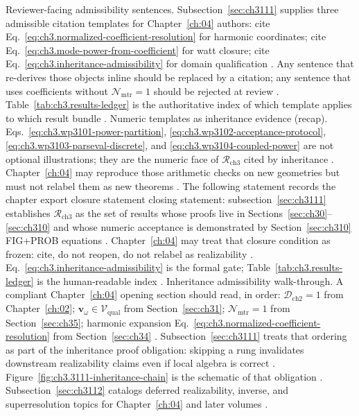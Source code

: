 Reviewer-facing admissibility sentences. Subsection~\ref{sec:ch3111} supplies three admissible citation templates for Chapter~\ref{ch:04} authors: cite Eq.~\eqref{eq:ch3.normalized-coefficient-resolution} for harmonic coordinates; cite Eq.~\eqref{eq:ch3.mode-power-from-coefficient} for watt closure; cite Eq.~\eqref{eq:ch3.inheritance-admissibility} for domain qualification
\cite{stratton1941}. Any sentence that re-derives those objects inline should be replaced by a citation; any sentence that uses coefficients without \(\mathcal{N}_{\mathrm{mtr}}=1\) should be rejected at review
\cite{devaney2004}. Table~\ref{tab:ch3.results-ledger} is the authoritative index of which template applies to which result bundle
\cite{hansen1988}.
Numeric templates as inheritance evidence (recap). Eqs.~\eqref{eq:ch3.wp3101-power-partition}, \eqref{eq:ch3.wp3102-acceptance-protocol}, \eqref{eq:ch3.wp3103-parseval-discrete}, and \eqref{eq:ch3.wp3104-coupled-power} are not optional illustrations; they are the numeric face of \(\mathcal{R}_{\mathrm{ch3}}\) cited by inheritance
\cite{harrington2001}. Chapter~\ref{ch:04} may reproduce those arithmetic checks on new geometries but must not relabel them as new theorems
\cite{devaney2004}.
The following statement records the chapter export closure statement closing statement: subsection~\ref{sec:ch3111} establishes \(\mathcal{R}_{\mathrm{ch3}}\) as the set of results whose proofs live in Sections~\ref{sec:ch30}--\ref{sec:ch310} and whose numeric acceptance is demonstrated by Section~\ref{sec:ch310} FIG+PROB equations
\cite{stratton1941}. Chapter~\ref{ch:04} may treat that closure condition as frozen: cite, do not reopen, do not relabel as realizability
\cite{devaney2004}. Eq.~\eqref{eq:ch3.inheritance-admissibility} is the formal gate; Table~\ref{tab:ch3.results-ledger} is the human-readable index
\cite{harrington2001}.
Inheritance admissibility walk-through. A compliant Chapter~\ref{ch:04} opening section should read, in order: \(\mathcal{D}_{\mathrm{ch2}}=1\) from Chapter~\ref{ch:02}; \(\mathbf{v}_\omega\in\mathcal{V}_{\mathrm{qual}}\) from Section~\ref{sec:ch31}; \(\mathcal{N}_{\mathrm{mtr}}=1\) from Section~\ref{sec:ch35}; harmonic expansion Eq.~\eqref{eq:ch3.normalized-coefficient-resolution} from Section~\ref{sec:ch34}
\cite{stratton1941}. Subsection~\ref{sec:ch3111} treats that ordering as part of the inheritance proof obligation: skipping a rung invalidates downstream realizability claims even if local algebra is correct
\cite{devaney2004}. Figure~\ref{fig:ch3.3111-inheritance-chain} is the schematic of that obligation
\cite{harrington2001}.
Subsection~\ref{sec:ch3112} catalogs deferred realizability, inverse, and superresolution topics for
Chapter~\ref{ch:04} and later volumes \cite{devaney2004}.
